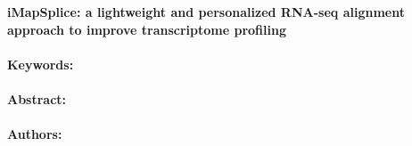 \noindent
\large {\bf iMapSplice: a lightweight and personalized RNA-seq alignment approach to improve transcriptome profiling} 


\normalsize 


\noindent \paragraph{Keywords:} 

\noindent \paragraph{Abstract:} 



\noindent \paragraph{Authors:} 

